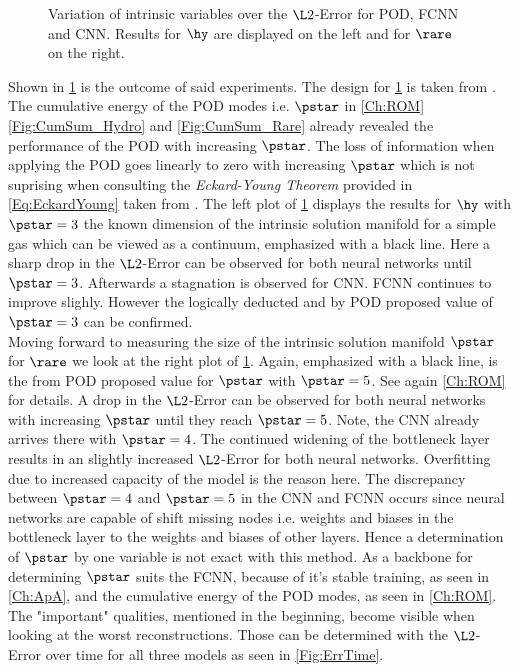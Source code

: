 \begin{figure}[htbp!]
	
	\caption{Variation of intrinsic variables over the $\L2$-Error for POD, FCNN and CNN. Results for $\hy$ are displayed on the left and for $\rare$ on the right.}
	\label{Fig:IntVar}
\end{figure}
Shown in \cref{Fig:IntVar} is the outcome of said experiments. The design for \cref{Fig:IntVar} is taken from \cite{Carlberg}. The cumulative energy of the POD modes i.e. $\pstar$ in \cref{Ch:ROM} \cref{Fig:CumSum_Hydro} and \cref{Fig:CumSum_Rare} already revealed the performance of the POD with increasing $\pstar$. The loss of information when applying the POD goes linearly to zero with increasing $\pstar$ which is not suprising when consulting the \textit{Eckard-Young Theorem} provided in \cref{Eq:EckardYoung} taken from \cite{Kutz}.
The left plot of \cref{Fig:IntVar} displays the results for $\hy$ with $\pstar=3$ the known dimension of the intrinsic solution manifold for a simple gas which can be viewed as a continuum, emphasized with a black line. Here a sharp drop in the $\L2$-Error can be observed for both neural networks until $\pstar = 3$. Afterwards a stagnation is observed for CNN. FCNN continues to improve slighly. However the logically deducted and by POD proposed value of $\pstar=3$ can be confirmed.\\
Moving forward to measuring the size of the intrinsic solution manifold \(\pstar\) for $\rare$ we look at the right plot of \cref{Fig:IntVar}. Again, emphasized  with a black line, is the from POD proposed value for $\pstar$ with $\pstar=5$. See again \cref{Ch:ROM} for details. A drop in the $\L2$-Error can be observed for both neural networks with increasing $\pstar$ until they reach $\pstar = 5$. Note, the CNN already arrives there with \(\pstar = 4\). The continued widening of the bottleneck layer results in an slightly increased $\L2$-Error for both neural networks. Overfitting due to increased capacity of the model is the reason here. The discrepancy between \(\pstar=4\) and \(\pstar = 5\) in the CNN and FCNN occurs since neural networks are capable of shift missing nodes i.e. weights and biases in the bottleneck layer to the weights and biases of other layers. Hence a determination of \(\pstar\) by one variable is not exact with this method. As a backbone for determining $\pstar$ suits the FCNN, because of it's stable training, as seen in \cref{Ch:ApA}, and the cumulative energy of the POD modes, as seen in \cref{Ch:ROM}.\\
The "important" qualities, mentioned in the beginning, become visible when looking at the worst reconstructions. Those can be determined with the $\L2$-Error over time for all three models as seen in \cref{Fig:ErrTime}.
